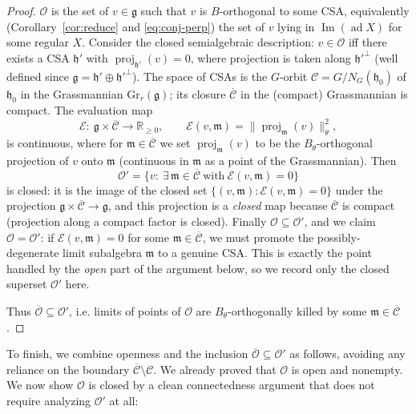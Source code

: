 \documentclass{amsart}
\theoremstyle{definition}
\begin{document}
\begin{proof}
$\mathcal O$ is the set of $v\in\mathfrak g$ such that $v$ is $B$-orthogonal to some
CSA, equivalently (Corollary~\ref{cor:reduce} and \eqref{eq:conj-perp}) the set of
$v$ lying in $\operatorname{Im}(\operatorname{ad}X)$ for some regular $X$. Consider
the closed semialgebraic description: $v\in\mathcal O$ iff there exists a CSA
$\mathfrak h'$ with $\operatorname{proj}_{\mathfrak h'}(v)=0$, where projection is
taken along $\mathfrak h'^{\perp}$ (well defined since
$\mathfrak g=\mathfrak h'\oplus\mathfrak h'^{\perp}$). The space of CSAs is the
$G$-orbit $\mathcal C=G/N_G(\mathfrak h_0)$ of $\mathfrak h_0$ in the Grassmannian
$\mathrm{Gr}_r(\mathfrak g)$; its closure $\overline{\mathcal C}$ in the (compact)
Grassmannian is compact. The evaluation map
\[
  \mathcal E:\ \mathfrak g\times \overline{\mathcal C}\longrightarrow\mathbb R_{\ge0},
  \qquad
  \mathcal E(v,\mathfrak m)=\bigl\|\operatorname{proj}_{\mathfrak m}(v)\bigr\|_\theta^2,
\]
is continuous, where for $\mathfrak m\in\overline{\mathcal C}$ we set
$\operatorname{proj}_{\mathfrak m}(v)$ to be the $B_\theta$-orthogonal projection of
$v$ onto $\mathfrak m$ (continuous in $\mathfrak m$ as a point of the Grassmannian).
Then
\[
  \mathcal O'=\bigl\{v:\ \exists\,\mathfrak m\in\overline{\mathcal C}\ \text{with}\
  \mathcal E(v,\mathfrak m)=0\bigr\}
\]
is closed: it is the image of the closed set
$\{(v,\mathfrak m):\mathcal E(v,\mathfrak m)=0\}$ under the projection
$\mathfrak g\times\overline{\mathcal C}\to\mathfrak g$, and this projection is a
\emph{closed} map because $\overline{\mathcal C}$ is compact (projection along a
compact factor is closed). Finally $\mathcal O\subseteq\mathcal O'$, and we claim
$\mathcal O=\mathcal O'$: if $\mathcal E(v,\mathfrak m)=0$ for some
$\mathfrak m\in\overline{\mathcal C}$, we must promote the possibly-degenerate limit
subalgebra $\mathfrak m$ to a genuine CSA. This is exactly the point handled by the
\emph{open} part of the argument below, so we record only the closed superset
$\mathcal O'$ here.

Thus $\overline{\mathcal O}\subseteq\mathcal O'$, i.e. limits of points of
$\mathcal O$ are $B_\theta$-orthogonally killed by some
$\mathfrak m\in\overline{\mathcal C}$.
\end{proof}

To finish, we combine openness and the inclusion
$\overline{\mathcal O}\subseteq\mathcal O'$ as follows, avoiding any reliance on
the boundary $\overline{\mathcal C}\setminus\mathcal C$. We already proved that
$\mathcal O$ is open and nonempty. We now show $\mathcal O$ is closed by a clean
connectedness argument that does not require analyzing $\mathcal O'$ at all:
\end{document}
